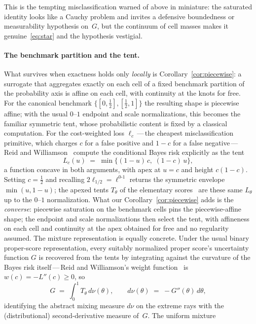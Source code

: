 \documentclass{article}
\theoremstyle{plain}
\theoremstyle{definition}
\begin{document}
This is the tempting misclassification warned of above in miniature: the saturated identity
looks like a Cauchy problem and invites a defensive boundedness or
measurability hypothesis on~$G$, but the continuum of cell masses
makes it genuine~\eqref{eq:star} and the hypothesis vestigial.

\paragraph{The benchmark partition and the tent.}
What survives when exactness holds only \emph{locally} is
Corollary~\ref{cor:piecewise}: a surrogate that aggregates exactly on
each cell of a fixed benchmark partition of the probability axis is
affine on each cell, with continuity at the knots for free. For the
canonical benchmark $\{[0,\tfrac12],[\tfrac12,1]\}$ the resulting
shape is piecewise affine; with the usual $0$--$1$ endpoint and scale normalizations, this becomes the familiar symmetric tent, whose
probabilistic content is fixed by a classical computation. For the
cost-weighted loss $\ell_c$\,---\,the cheapest misclassification primitive,
which charges $c$ for a false positive and $1-c$ for a false
negative\,---\,Reid and Williamson~\cite[Thm~14]{ReidWilliamson2011} compute
the conditional Bayes risk explicitly as the tent
\[
L_c(u)\;=\;\min\bigl\{(1-u)\,c,\;(1-c)\,u\bigr\},
\]
a function concave in both arguments, with apex at $u=c$ and height $c(1-c)$.
Setting $c=\tfrac12$ and recalling $2\ell_{1/2}=\ell^{0\text{-}1}$ returns the
symmetric envelope $\min(u,1-u)$; the apexed tents $T_\theta$ of the elementary
scores~\cite{Schervish1989,EGJK2016} are these same $L_\theta$ up to the
$0$--$1$ normalization. What our Corollary~\ref{cor:piecewise} adds is the
\emph{converse}: piecewise saturation on the benchmark cells pins the piecewise-affine shape; the endpoint and scale normalizations then select the tent, with affineness on each cell and continuity at the apex obtained
for free and no regularity assumed. The mixture representation is equally
concrete. Under the usual binary proper-score representation, every suitably normalized proper score's uncertainty function $G$ is recovered from the
tents by integrating against the curvature of the Bayes risk
itself\,---\,Reid and Williamson's weight
function~\cite[Thm~16]{ReidWilliamson2011} is $w(c)=-L''(c)\ge0$, so
\[
G\;=\;\int_0^1 T_\theta\,d\nu(\theta),
\qquad d\nu(\theta)\;=\;-G''(\theta)\,d\theta,
\]
identifying the abstract mixing measure $d\nu$ on the extreme rays with the
(distributional) second-derivative measure of~$G$. The uniform mixture
\end{document}
